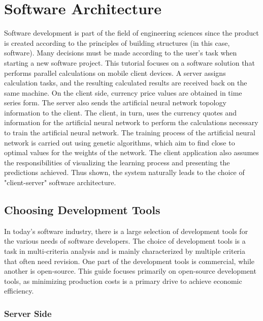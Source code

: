\newpage
\chapter{Software Architecture}
\label{chapter03}

Software development is part of the field of engineering sciences since the product is created according to the principles of building structures (in this case, software). Many decisions must be made according to the user's task when starting a new software project. This tutorial focuses on a software solution that performs parallel calculations on mobile client devices. A server assigns calculation tasks, and the resulting calculated results are received back on the same machine. On the client side, currency price values are obtained in time series form. The server also sends the artificial neural network topology information to the client. The client, in turn, uses the currency quotes and information for the artificial neural network to perform the calculations necessary to train the artificial neural network. The training process of the artificial neural network is carried out using genetic algorithms, which aim to find close to optimal values for the weights of the network. The client application also assumes the responsibilities of visualizing the learning process and presenting the predictions achieved. Thus shown, the system naturally leads to the choice of "client-server" software architecture.

\section{Choosing Development Tools}

In today's software industry, there is a large selection of development tools for the various needs of software developers. The choice of development tools is a task in multi-criteria analysis and is mainly characterized by multiple criteria that often need revision. One part of the development tools is commercial, while another is open-source. This guide focuses primarily on open-source development tools, as minimizing production costs is a primary drive to achieve economic efficiency.

\subsection{Server Side}

